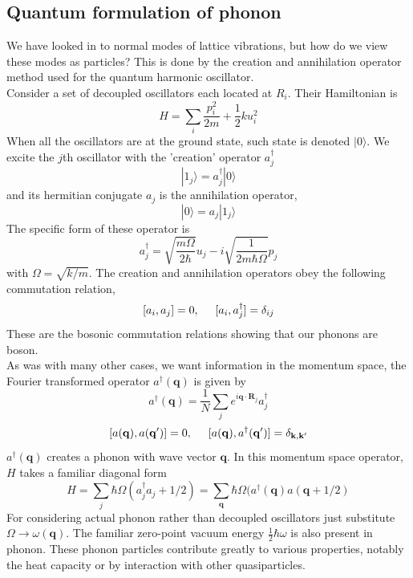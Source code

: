 \documentclass{article}
\begin{document}
\subsection*{Quantum formulation of phonon}
We have looked in to normal modes of lattice vibrations, but how do we view these modes as particles? This is done by the creation and annihilation operator method used for the quantum harmonic oscillator.\\
Consider a set of decoupled oscillators each located at $R_i$. Their Hamiltonian is
$$H=\sum_i\frac{p_i^2}{2m}+\frac{1}{2}ku_{i}^{2}$$
When all the oscillators are at the ground state, such state is denoted $|0\rangle$. We excite the $j$th oscillator with the 'creation' operator $a_j^{\dagger}$
$$|1_j\rangle=a_{j}^{\dagger}|0\rangle$$
and its hermitian conjugate $a_j$ is the annihilation operator,
$$|0\rangle=a_j|1_j\rangle$$
The specific form of these operator is
$$a_{j}^{\dagger}=\sqrt{\frac{m\Omega}{2\hbar}}u_j-i\sqrt{\frac{1}{2m\hbar\Omega}}p_j$$
with $\Omega=\sqrt{k/m}$. The creation and annihilation operators obey the following commutation relation,
$$[a_i,a_j]=0,\hspace{5mm}[a_i,a_{j}^{\dagger}]=\delta_{ij}$$
These are the bosonic commutation relations showing that our phonons are boson.\\
As was with many other cases, we want information in the momentum space, the Fourier transformed operator $a^{\dagger}(\mathbf{q})$ is given by
$$a^{\dagger}(\mathbf{q})=\frac{1}{N}\sum_je^{i\mathbf{q}\cdot\mathbf{R}_j}a_{j}^{\dagger}$$
$$[a(\mathbf{q}),a(\mathbf{q}')]=0,\hspace{5mm}[a(\mathbf{q}),a^{\dagger}(\mathbf{q}')]=\delta_{\mathbf{k},\mathbf{k'}}$$
$a^{\dagger}(\mathbf{q})$ creates a phonon with wave vector $\mathbf{q}$. In this momentum space operator, $H$ takes a familiar diagonal form
$$H=\sum_j\hbar\Omega(a^{\dagger}_ja_j+1/2)=\sum_{\mathbf{q}}\hbar\Omega(a^{\dagger}(\mathbf{q})a(\mathbf{q}+1/2)$$
For considering actual phonon rather than decoupled oscillators just substitute $\Omega\to\omega(\mathbf{q})$. The familiar zero-point vacuum energy $\frac{1}{2}\hbar\omega$ is also present in phonon. These phonon particles contribute greatly to various properties, notably the heat capacity or by interaction with other quasiparticles. \\
\end{document}
